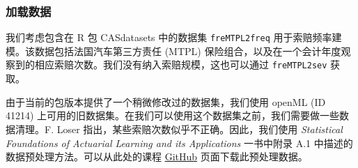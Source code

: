 \documentclass[
]{article}
\newenvironment{Shaded}{\begin{snugshade}}{\end{snugshade}}
\newcommand{\AttributeTok}[1]{\textcolor[rgb]{0.13,0.29,0.53}{#1}}
\newcommand{\ControlFlowTok}[1]{\textcolor[rgb]{0.13,0.29,0.53}{\textbf{#1}}}
\newcommand{\DecValTok}[1]{\textcolor[rgb]{0.00,0.00,0.81}{#1}}
\newcommand{\FunctionTok}[1]{\textcolor[rgb]{0.13,0.29,0.53}{\textbf{#1}}}
\newcommand{\NormalTok}[1]{#1}
\newcommand{\OtherTok}[1]{\textcolor[rgb]{0.56,0.35,0.01}{#1}}
\newcommand{\SpecialCharTok}[1]{\textcolor[rgb]{0.81,0.36,0.00}{\textbf{#1}}}
\newcommand{\StringTok}[1]{\textcolor[rgb]{0.31,0.60,0.02}{#1}}
\begin{document}
\begin{Shaded}
\end{Shaded}

\subsubsection{加载数据}\label{ux52a0ux8f7dux6570ux636e}

我们考虑包含在 R 包 CASdatasets 中的数据集 \texttt{freMTPL2freq}
用于索赔频率建模。该数据包括法国汽车第三方责任 (MTPL)
保险组合，以及在一个会计年度观察到的相应索赔次数。我们没有纳入索赔规模，这也可以通过
\texttt{freMTPL2sev} 获取。

由于当前的包版本提供了一个稍微修改过的数据集，我们使用 openML (ID 41214)
上可用的旧数据集。在我们可以使用这个数据集之前，我们需要做一些数据清理。F.
Loser 指出，某些索赔次数似乎不正确。因此，我们使用 \emph{Statistical
Foundations of Actuarial Learning and its Applications} 一书中附录 A.1
中描述的数据预处理方法。可以从此处的课程
\href{https://github.com/actuarial-data-science/CourseDeepLearningWithActuarialApplications}{GitHub}
页面下载此预处理数据。
\end{document}
